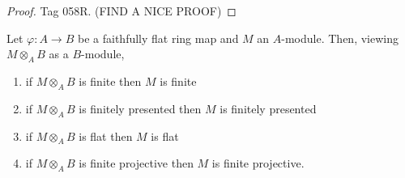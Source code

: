 \documentclass[12pt]{article}
\begin{document}
\begin{proof}
Tag 058R. (FIND A NICE PROOF)
\end{proof}

\begin{prop}
Let $\varphi : A \to B$ be a faithfully flat ring map and $M$ an $A$-module. Then, viewing $M \otimes_A B$ as a $B$-module,
\begin{enumerate}
\item if $M \otimes_A B$ is finite then $M$ is finite
\item if $M \otimes_A B$ is finitely presented then $M$ is finitely presented
\item if $M \otimes_A B$ is flat then $M$ is flat
\item if $M \otimes_A B$ is finite projective then $M$ is finite projective.
\end{enumerate}
\end{prop}
\end{document}

